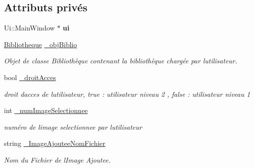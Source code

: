 \subsection*{Attributs privés}
\begin{DoxyCompactItemize}
\item 
\mbox{\label{classMainWindow_a35466a70ed47252a0191168126a352a5}} 
Ui\+::\+Main\+Window $\ast$ {\bfseries ui}
\item 
\mbox{\label{classMainWindow_a7bc14d77c1e29f3e18a4a8ced1598a39}} 
\hyperlink{classBibliotheque}{Bibliotheque} \hyperlink{classMainWindow_a7bc14d77c1e29f3e18a4a8ced1598a39}{\+\_\+obj\+Biblio}
\begin{DoxyCompactList}\small\item\em Objet de classe Bibliothèque contenant la bibliothèque chargée par l\textquotesingle{}utilisateur. \end{DoxyCompactList}\item 
\mbox{\label{classMainWindow_ad8c738f663993bed8612b9d6497bb801}} 
bool \hyperlink{classMainWindow_ad8c738f663993bed8612b9d6497bb801}{\+\_\+droit\+Acces}
\begin{DoxyCompactList}\small\item\em droit d\textquotesingle{}acces de l\textquotesingle{}utilisateur, true \+: utilisateur niveau 2 , false \+: utilisateur niveau 1 \end{DoxyCompactList}\item 
\mbox{\label{classMainWindow_a824a2583634dc3f78d3dd86795ece1db}} 
int \hyperlink{classMainWindow_a824a2583634dc3f78d3dd86795ece1db}{\+\_\+num\+Image\+Selectionnee}
\begin{DoxyCompactList}\small\item\em numéro de l\textquotesingle{}image selectionnee par l\textquotesingle{}utilisateur \end{DoxyCompactList}\item 
\mbox{\label{classMainWindow_a80da0c9a2bf3ee98c4bac057e60e7ec4}} 
string \hyperlink{classMainWindow_a80da0c9a2bf3ee98c4bac057e60e7ec4}{\+\_\+\+Image\+Ajoutee\+Nom\+Fichier}
\begin{DoxyCompactList}\small\item\em Nom du Fichier de l\textquotesingle{}Image Ajoutee. \end{DoxyCompactList}\item 

\end{DoxyCompactItemize}
